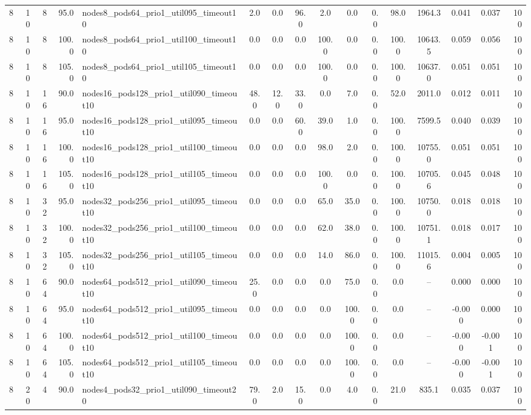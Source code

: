 \begin{tabular}{r r r r l c c c c c c c c c c r}
8 & 10 & 8 & 95.0 & nodes8\_pods64\_prio1\_util095\_timeout10 & 2.0 & 0.0 & 96.0 & 2.0 & 0.0 & 0.0 & 98.0 & 1964.3 & 0.041 & 0.037 & 100 \\
8 & 10 & 8 & 100.0 & nodes8\_pods64\_prio1\_util100\_timeout10 & 0.0 & 0.0 & 0.0 & 100.0 & 0.0 & 0.0 & 100.0 & 10643.5 & 0.059 & 0.056 & 100 \\
8 & 10 & 8 & 105.0 & nodes8\_pods64\_prio1\_util105\_timeout10 & 0.0 & 0.0 & 0.0 & 100.0 & 0.0 & 0.0 & 100.0 & 10637.0 & 0.051 & 0.051 & 100 \\
8 & 10 & 16 & 90.0 & nodes16\_pods128\_prio1\_util090\_timeout10 & 48.0 & 12.0 & 33.0 & 0.0 & 7.0 & 0.0 & 52.0 & 2011.0 & 0.012 & 0.011 & 100 \\
8 & 10 & 16 & 95.0 & nodes16\_pods128\_prio1\_util095\_timeout10 & 0.0 & 0.0 & 60.0 & 39.0 & 1.0 & 0.0 & 100.0 & 7599.5 & 0.040 & 0.039 & 100 \\
8 & 10 & 16 & 100.0 & nodes16\_pods128\_prio1\_util100\_timeout10 & 0.0 & 0.0 & 0.0 & 98.0 & 2.0 & 0.0 & 100.0 & 10755.0 & 0.051 & 0.051 & 100 \\
8 & 10 & 16 & 105.0 & nodes16\_pods128\_prio1\_util105\_timeout10 & 0.0 & 0.0 & 0.0 & 100.0 & 0.0 & 0.0 & 100.0 & 10705.6 & 0.045 & 0.048 & 100 \\
8 & 10 & 32 & 95.0 & nodes32\_pods256\_prio1\_util095\_timeout10 & 0.0 & 0.0 & 0.0 & 65.0 & 35.0 & 0.0 & 100.0 & 10750.0 & 0.018 & 0.018 & 100 \\
8 & 10 & 32 & 100.0 & nodes32\_pods256\_prio1\_util100\_timeout10 & 0.0 & 0.0 & 0.0 & 62.0 & 38.0 & 0.0 & 100.0 & 10751.1 & 0.018 & 0.017 & 100 \\
8 & 10 & 32 & 105.0 & nodes32\_pods256\_prio1\_util105\_timeout10 & 0.0 & 0.0 & 0.0 & 14.0 & 86.0 & 0.0 & 100.0 & 11015.6 & 0.004 & 0.005 & 100 \\
8 & 10 & 64 & 90.0 & nodes64\_pods512\_prio1\_util090\_timeout10 & 25.0 & 0.0 & 0.0 & 0.0 & 75.0 & 0.0 & 0.0 & -- & 0.000 & 0.000 & 100 \\
8 & 10 & 64 & 95.0 & nodes64\_pods512\_prio1\_util095\_timeout10 & 0.0 & 0.0 & 0.0 & 0.0 & 100.0 & 0.0 & 0.0 & -- & -0.000 & 0.000 & 100 \\
8 & 10 & 64 & 100.0 & nodes64\_pods512\_prio1\_util100\_timeout10 & 0.0 & 0.0 & 0.0 & 0.0 & 100.0 & 0.0 & 0.0 & -- & -0.000 & -0.001 & 100 \\
8 & 10 & 64 & 105.0 & nodes64\_pods512\_prio1\_util105\_timeout10 & 0.0 & 0.0 & 0.0 & 0.0 & 100.0 & 0.0 & 0.0 & -- & -0.000 & -0.001 & 100 \\
8 & 20 & 4 & 90.0 & nodes4\_pods32\_prio1\_util090\_timeout20 & 79.0 & 2.0 & 15.0 & 0.0 & 4.0 & 0.0 & 21.0 & 835.1 & 0.035 & 0.037 & 100 \\

\end{tabular}
